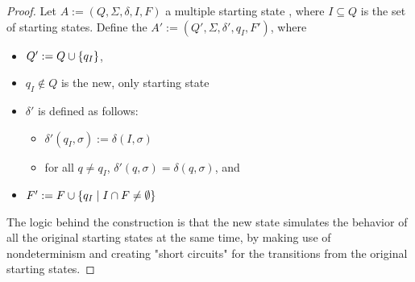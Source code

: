 \begin{proof}
	Let $A:=(Q,\Sigma,\delta,I,F)$ a multiple starting state \NFA, where $I\subseteq Q$ is the set of starting states.
	Define the \NFA $A':=(Q',\Sigma,\delta',q_I,F')$, where
	\begin{itemize}
		\item $Q':=Q\cup\{q_I\}$,
		\item $q_I\notin Q$ is the new, only starting state
		\item $\delta'$ is defined as follows:
		      \begin{itemize}
			      \item $\delta'(q_I,\sigma):=\delta(I,\sigma)$
			      \item for all $q\ne q_I$, $\delta'(q,\sigma)=\delta(q,\sigma)$, and
		      \end{itemize}
		\item $F':=F\cup\{q_I\mid I\cap F\ne\emptyset\}$
	\end{itemize}
	The logic behind the construction is that the new state simulates the behavior of all the original starting states at the same time, by making use of nondeterminism and creating "short circuits" for the transitions from the original starting states.


\end{proof}
